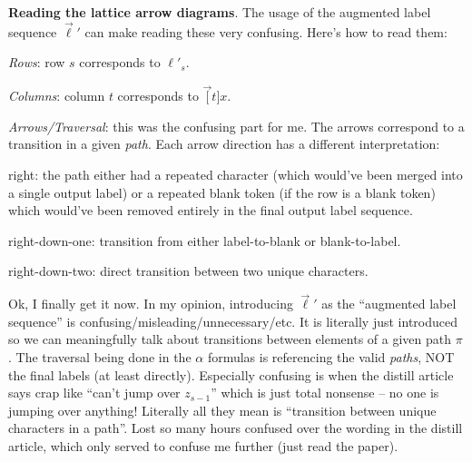 \documentclass[11pt]{article}
\begin{document}
\textbf{Reading the lattice arrow diagrams}. The usage of the augmented label sequence $\vec{\ell}'$ can make reading these very confusing. Here's how to read them:
\begin{compactitem}
	\item \textit{Rows}: row $s$ corresponds to $\ell'_s$. 
	\item \textit{Columns}: column $t$ corresponds to $\vec[t]{x}$. 
	\item \textit{Arrows/Traversal}: this was the confusing part for me. The arrows correspond to a transition in a given \textit{path}. Each arrow direction has a different interpretation:
	\begin{compactitem}
		\item right: the path either had a repeated character (which would've been merged into a single output label) or a repeated blank token (if the row is a blank token) which would've been removed entirely in the final output label sequence. 
		\item right-down-one: transition from either label-to-blank or blank-to-label. 
		\item right-down-two: direct transition between two unique characters. 
	\end{compactitem}
\end{compactitem}

Ok, I finally get it now. In my opinion, introducing $\vec{\ell}'$ as the ``augmented label sequence'' is confusing/misleading/unnecessary/etc. It is literally just introduced so we can meaningfully talk about transitions between elements of a given path $\pi$. The traversal being done in the $\alpha$ formulas is referencing the valid \textit{paths}, NOT the final labels (at least directly). Especially confusing is when the distill article says crap like ``can't jump over $z_{s-1}$'' which is just total nonsense -- no one is jumping over anything! Literally all they mean is ``transition between unique characters in a path''. Lost so many hours confused over the wording in the distill article, which only served to confuse me further (just read the paper).  
\end{document}
